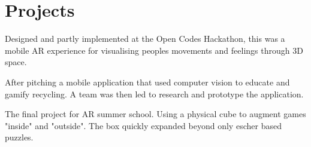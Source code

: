 \documentclass[a4paper]{deedy-resume} %
\begin{document}
\begin{minipage}[t]{0.66\textwidth}
\section{Projects}


Designed and partly implemented at the Open Codes Hackathon, this was a mobile AR experience for visualising peoples movements and feelings through 3D space.

\sectionspace %



After pitching a mobile application that used computer vision to educate and gamify recycling. %
A team was then led to research and prototype the application. %

\sectionspace %



The final project for AR summer school. Using a physical cube to augment games "inside" and "outside". The box quickly expanded beyond only escher based puzzles.%
\sectionspace %


\end{minipage}
\end{document}
